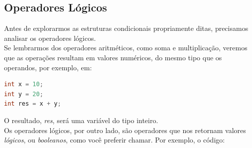 \documentclass[12pt]{article}
\begin{document}
\subsection{Operadores Lógicos}
Antes de explorarmos as estruturas condicionais propriamente ditas, precisamos analisar os operadores lógicos. \\
Se lembrarmos dos operadores aritméticos, como soma e multiplicação, veremos que as operações resultam em valores numéricos, do mesmo tipo que os operandos, por exemplo, em: 
\begin{lstlisting}[language=C++]
int x = 10;
int y = 20;
int res = x + y;
\end{lstlisting}
O resultado, \textit{res}, será uma variável do tipo inteiro. \\
Os operadores lógicos, por outro lado, são operadores que nos retornam valores \textit{lógicos}, ou \textit{booleanos}, como você preferir chamar. Por exemplo, o código:
\end{document}
